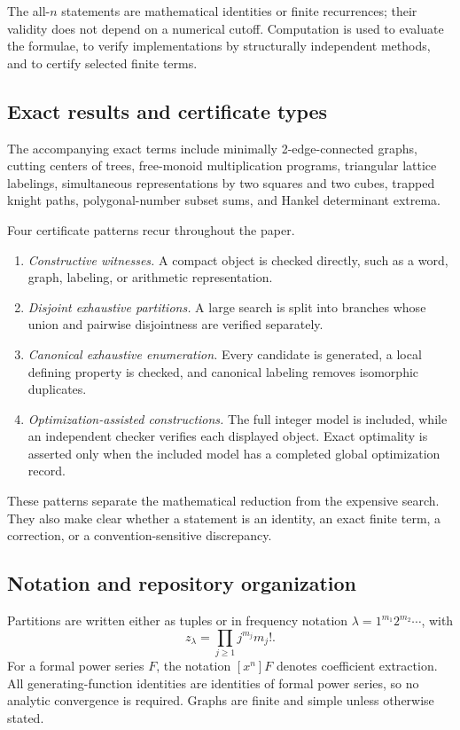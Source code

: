 The all-\(n\) statements are mathematical identities or finite recurrences;
their validity does not depend on a numerical cutoff.  Computation is used to
evaluate the formulae, to verify implementations by structurally independent
methods, and to certify selected finite terms.

\subsection{Exact results and certificate types}

The accompanying exact terms include minimally 2-edge-connected graphs,
cutting centers of trees, free-monoid multiplication programs, triangular
lattice labelings, simultaneous representations by two squares and two cubes,
trapped knight paths, polygonal-number subset sums, and Hankel determinant
extrema.

Four certificate patterns recur throughout the paper.

\begin{enumerate}
\item \emph{Constructive witnesses.}  A compact object is checked directly,
      such as a word, graph, labeling, or arithmetic representation.
\item \emph{Disjoint exhaustive partitions.}  A large search is split into
      branches whose union and pairwise disjointness are verified separately.
\item \emph{Canonical exhaustive enumeration.}  Every candidate is generated,
      a local defining property is checked, and canonical labeling removes
      isomorphic duplicates.
\item \emph{Optimization-assisted constructions.}  The full integer model is
      included, while an independent checker verifies each displayed object.
      Exact optimality is asserted only when the included model has a completed
      global optimization record.
\end{enumerate}

These patterns separate the mathematical reduction from the expensive search.
They also make clear whether a statement is an identity, an exact finite term,
a correction, or a convention-sensitive discrepancy.

\subsection{Notation and repository organization}

Partitions are written either as tuples or in frequency notation
\(\lambda=1^{m_1}2^{m_2}\cdots\), with
\[
  z_\lambda=\prod_{j\ge1}j^{m_j}m_j!.
\]
For a formal power series \(F\), the notation \([x^n]F\) denotes coefficient
extraction.  All generating-function identities are identities of formal power
series, so no analytic convergence is required.  Graphs are finite and simple
unless otherwise stated.

